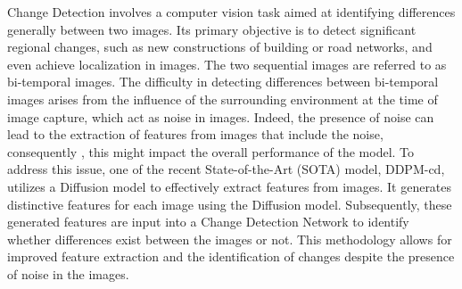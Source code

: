 \documentclass[../main.tex]{subfiles}
\begin{document}
Change Detection involves a computer vision task aimed at identifying differences generally between two images. Its primary objective is to detect significant regional changes, such as new constructions of building or road networks, and even achieve localization in images. The two sequential images are referred to as bi-temporal images. The difficulty in detecting differences between bi-temporal images arises from the influence of the surrounding environment at the time of image capture, which act as noise in images. Indeed, the presence of noise can lead to the extraction of features from images that include the noise, consequently , this might impact the overall performance of the model. To address this issue, one of the recent State-of-the-Art (SOTA) model, DDPM-cd, utilizes a Diffusion model to effectively extract features from images.\cite{bandara2022ddpmcd} It generates distinctive features for each image using the Diffusion model. Subsequently, these generated features are input into a Change Detection Network to identify whether differences exist between the images or not. This methodology allows for improved feature extraction and the identification of changes despite the presence of noise in the images.
\end{document}
